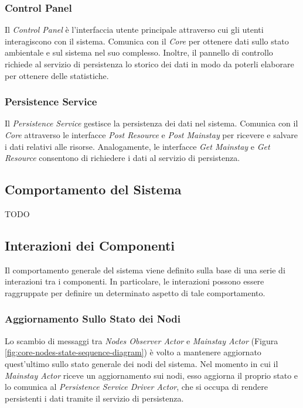 \documentclass{scrartcl}
\begin{document}
\subsubsection{Control Panel}
Il \textit{Control Panel} è l'interfaccia utente principale attraverso cui gli utenti interagiscono con il sistema. Comunica con il \textit{Core} per ottenere dati sullo stato ambientale e sul sistema nel suo complesso. Inoltre, il pannello di controllo richiede al servizio di persistenza lo storico dei dati in modo da poterli elaborare per ottenere delle statistiche.

\subsubsection{Persistence Service}
Il \textit{Persistence Service} gestisce la persistenza dei dati nel sistema. Comunica con il \textit{Core} attraverso le interfacce \textit{Post Resource} e \textit{Post Mainstay} per ricevere e salvare i dati relativi alle risorse. Analogamente, le interfacce \textit{Get Mainstay} e \textit{Get Resource }consentono di richiedere i dati al servizio di persistenza.

\subsection{Comportamento del Sistema}

TODO

\subsection{Interazioni dei Componenti}

Il comportamento generale del sistema viene definito sulla base di una serie di interazioni tra i componenti. In particolare, le interazioni possono essere raggruppate per definire un determinato aspetto di tale comportamento.

\subsubsection{Aggiornamento Sullo Stato dei Nodi}

Lo scambio di messaggi tra \textit{Nodes Observer Actor} e \textit{Mainstay Actor} (Figura \ref{fig:core-nodes-state-sequence-diagram}) è volto a mantenere aggiornato quest'ultimo sullo stato generale dei nodi del sistema. Nel momento in cui il \textit{Mainstay Actor} riceve un aggiornamento sui nodi, esso aggiorna il proprio stato e lo comunica al \textit{Persistence Service Driver Actor}, che si occupa di rendere persistenti i dati tramite il servizio di persistenza.
\end{document}
